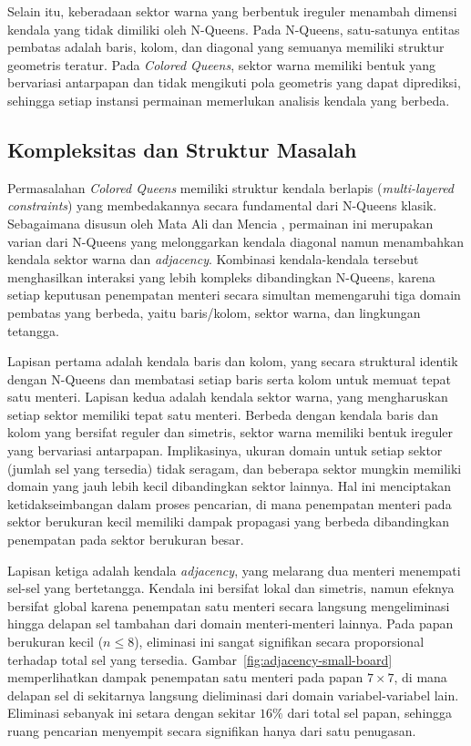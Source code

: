 Selain itu, keberadaan sektor warna yang berbentuk ireguler menambah dimensi kendala yang tidak dimiliki oleh N-Queens. Pada N-Queens, satu-satunya entitas pembatas adalah baris, kolom, dan diagonal yang semuanya memiliki struktur geometris teratur. Pada \textit{Colored Queens}, sektor warna memiliki bentuk yang bervariasi antarpapan dan tidak mengikuti pola geometris yang dapat diprediksi, sehingga setiap instansi permainan memerlukan analisis kendala yang berbeda.

\subsection{Kompleksitas dan Struktur Masalah}
\label{subsec:colored-queens-kompleksitas}
Permasalahan \textit{Colored Queens} memiliki struktur kendala berlapis (\textit{multi-layered constraints}) yang membedakannya secara fundamental dari N-Queens klasik. Sebagaimana disusun oleh Mata Ali dan Mencia \cite{ali2026quboformulationgeneralizedlinkedin}, permainan ini merupakan varian dari N-Queens yang melonggarkan kendala diagonal namun menambahkan kendala sektor warna dan \textit{adjacency}. Kombinasi kendala-kendala tersebut menghasilkan interaksi yang lebih kompleks dibandingkan N-Queens, karena setiap keputusan penempatan menteri secara simultan memengaruhi tiga domain pembatas yang berbeda, yaitu baris/kolom, sektor warna, dan lingkungan tetangga.

Lapisan pertama adalah kendala baris dan kolom, yang secara struktural identik dengan N-Queens dan membatasi setiap baris serta kolom untuk memuat tepat satu menteri. Lapisan kedua adalah kendala sektor warna, yang mengharuskan setiap sektor memiliki tepat satu menteri. Berbeda dengan kendala baris dan kolom yang bersifat reguler dan simetris, sektor warna memiliki bentuk ireguler yang bervariasi antarpapan. Implikasinya, ukuran domain untuk setiap sektor (jumlah sel yang tersedia) tidak seragam, dan beberapa sektor mungkin memiliki domain yang jauh lebih kecil dibandingkan sektor lainnya. Hal ini menciptakan ketidakseimbangan dalam proses pencarian, di mana penempatan menteri pada sektor berukuran kecil memiliki dampak propagasi yang berbeda dibandingkan penempatan pada sektor berukuran besar.

Lapisan ketiga adalah kendala \textit{adjacency}, yang melarang dua menteri menempati sel-sel yang bertetangga. Kendala ini bersifat lokal dan simetris, namun efeknya bersifat global karena penempatan satu menteri secara langsung mengeliminasi hingga delapan sel tambahan dari domain menteri-menteri lainnya. Pada papan berukuran kecil ($n \leq 8$), eliminasi ini sangat signifikan secara proporsional terhadap total sel yang tersedia. Gambar~\ref{fig:adjacency-small-board} memperlihatkan dampak penempatan satu menteri pada papan $7 \times 7$, di mana delapan sel di sekitarnya langsung dieliminasi dari domain variabel-variabel lain. Eliminasi sebanyak ini setara dengan sekitar $16\%$ dari total sel papan, sehingga ruang pencarian menyempit secara signifikan hanya dari satu penugasan.

